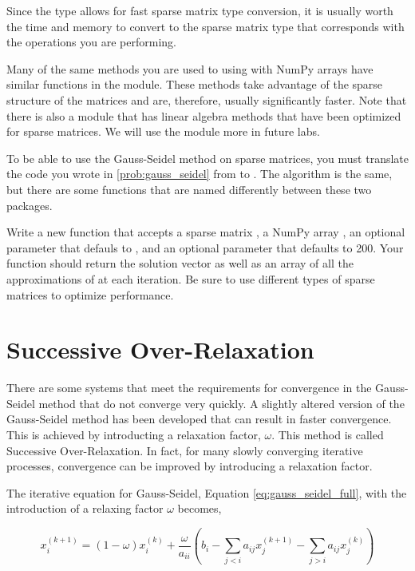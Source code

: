 Since the  type allows for fast sparse matrix type conversion, it is usually worth the time and memory to convert to the sparse matrix type that corresponds with the operations you are performing.

Many of the same methods you are used to using with NumPy arrays have similar functions in the  module. These methods take advantage of the sparse structure of the matrices and are, therefore, usually significantly faster. Note that there is also a  module that has linear algebra methods that have been optimized for sparse matrices. We will use the  module more in future labs.

\begin{problem}
To be able to use the Gauss-Seidel method on sparse matrices, you must translate the code you wrote in \ref{prob:gauss_seidel} from  to . The algorithm is the same, but there are some functions that are named differently between these two packages.

Write a new function that accepts a sparse matrix , a NumPy array , an optional parameter  that defauls to , and an optional parameter  that defaults to 200. Your function should return the solution vector  as well as an array of all the approximations of  at each iteration. Be sure to use different types of sparse matrices to optimize performance.
\end{problem}

\section*{Successive Over-Relaxation}
There are some systems that meet the requirements for convergence in the Gauss-Seidel method that do not converge very quickly. A slightly altered version of the Gauss-Seidel method has been developed that can result in faster convergence. This is achieved by introducting a relaxation factor, $\omega$. This method is called Successive Over-Relaxation. In fact, for many slowly converging iterative processes, convergence can be improved by introducing a relaxation factor.

The iterative equation for Gauss-Seidel, Equation \ref{eq:gauss_seidel_full}, with the introduction of a relaxing factor $\omega$ becomes,

$$
x_i^{(k+1)} = (1 - \omega)x_i^{(k)} + \frac{\omega}{a_{ii}} \left (b_i - \sum_{j < i}a_{ij}x^{(k+1)}_j - \sum_{j > i}a_{ij}x^{(k)}_j \right )
$$

